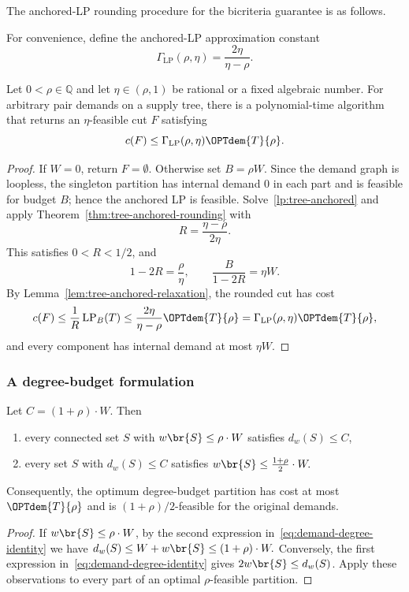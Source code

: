 The anchored-LP rounding procedure for the bicriteria guarantee is as follows.



For convenience, define the anchored-LP approximation constant
\[
    \Gamma_{\mathrm{LP}}(\rho,\eta)=\frac{2\eta}{\eta-\rho}.
\]

\begin{corollary}\label{cor:tree-general-demand-bicriteria}
    Let $0<\rho\in\mathbb{Q}$ and let $\eta\in(\rho,1)$ be rational or a fixed algebraic number. For arbitrary pair demands on a supply tree, there is a polynomial-time algorithm that returns an $\eta$-feasible cut $F$ satisfying
    \[
        c(F)\leq\Gamma_{\mathrm{LP}}(\rho,\eta)\OPTdem{T}{\rho}.
    \]
\end{corollary}
\begin{proof}
    If $W=0$, return $F=\emptyset$. Otherwise set $B=\rho W$. Since the demand graph is loopless, the singleton partition has internal demand $0$ in each part and is feasible for budget $B$; hence the anchored LP is feasible. Solve~\eqref{lp:tree-anchored} and apply Theorem~\ref{thm:tree-anchored-rounding} with
    \[
        R=\frac{\eta-\rho}{2\eta}.
    \]
    This satisfies $0<R<1/2$, and
    \[
        1-2R=\frac{\rho}{\eta},
        \qquad
        \frac{B}{1-2R}=\eta W.
    \]
    By Lemma~\ref{lem:tree-anchored-relaxation}, the rounded cut has cost
    \[
        c(F)\leq\frac{1}{R}\operatorname{LP}_B(T)
        \leq\frac{2\eta}{\eta-\rho}\OPTdem{T}{\rho}
        =\Gamma_{\mathrm{LP}}(\rho,\eta)\OPTdem{T}{\rho},
    \]
    and every component has internal demand at most $\eta W$.
\end{proof}

\subsubsection{A degree-budget formulation}

\begin{lemma}\label{lem:degree-budget-sandwich}
    Let $C=(1+\rho)\cdot W$. Then
    \begin{enumerate}
        \item every connected set $S$ with $w\br{S}\leq\rho \cdot W$ satisfies $d_w(S)\leq C$,
        \item every set $S$ with $d_w(S)\leq C$ satisfies $
            w\br{S}\leq\frac{1+\rho}{2}\cdot W.$
    \end{enumerate}
    Consequently, the optimum degree-budget partition has cost at most $\OPTdem{T}{\rho}$ and is $(1+\rho)/2$-feasible for the original demands.
\end{lemma}
\begin{proof}
    If $w\br{S}\leq\rho \cdot W$, by the second expression in~\eqref{eq:demand-degree-identity} we have $d_w(S)\leq W+w\br{S}\leq(1+\rho)\cdot W.$
    Conversely, the first expression in~\eqref{eq:demand-degree-identity} gives $2w\br{S}\leq d_w(S)$. Apply these observations to every part of an optimal $\rho$-feasible partition.
\end{proof}

